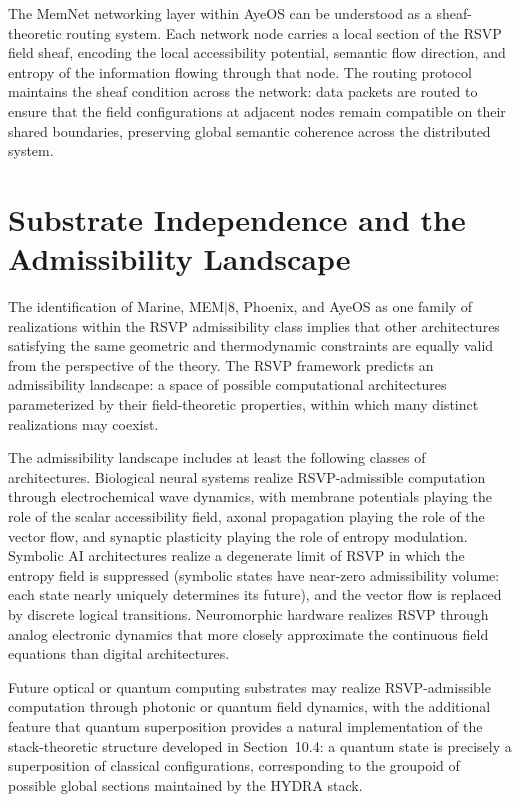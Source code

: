 \documentclass[12pt, a4paper, openany]{book}
\theoremstyle{plain}
\theoremstyle{definition}
\theoremstyle{remark}
\begin{document}
The MemNet networking layer within AyeOS can be understood as a sheaf-theoretic routing system. Each network node carries a local section of the RSVP field sheaf, encoding the local accessibility potential, semantic flow direction, and entropy of the information flowing through that node. The routing protocol maintains the sheaf condition across the network: data packets are routed to ensure that the field configurations at adjacent nodes remain compatible on their shared boundaries, preserving global semantic coherence across the distributed system.

\section{Substrate Independence and the Admissibility Landscape}

The identification of Marine, MEM$|$8, Phoenix, and AyeOS as one family of realizations within the RSVP admissibility class implies that other architectures satisfying the same geometric and thermodynamic constraints are equally valid from the perspective of the theory. The RSVP framework predicts an admissibility landscape: a space of possible computational architectures parameterized by their field-theoretic properties, within which many distinct realizations may coexist.

The admissibility landscape includes at least the following classes of architectures. Biological neural systems realize RSVP-admissible computation through electrochemical wave dynamics, with membrane potentials playing the role of the scalar accessibility field, axonal propagation playing the role of the vector flow, and synaptic plasticity playing the role of entropy modulation. Symbolic AI architectures realize a degenerate limit of RSVP in which the entropy field is suppressed (symbolic states have near-zero admissibility volume: each state nearly uniquely determines its future), and the vector flow is replaced by discrete logical transitions. Neuromorphic hardware realizes RSVP through analog electronic dynamics that more closely approximate the continuous field equations than digital architectures.

Future optical or quantum computing substrates may realize RSVP-admissible computation through photonic or quantum field dynamics, with the additional feature that quantum superposition provides a natural implementation of the stack-theoretic structure developed in Section~10.4: a quantum state is precisely a superposition of classical configurations, corresponding to the groupoid of possible global sections maintained by the HYDRA stack.
\end{document}
